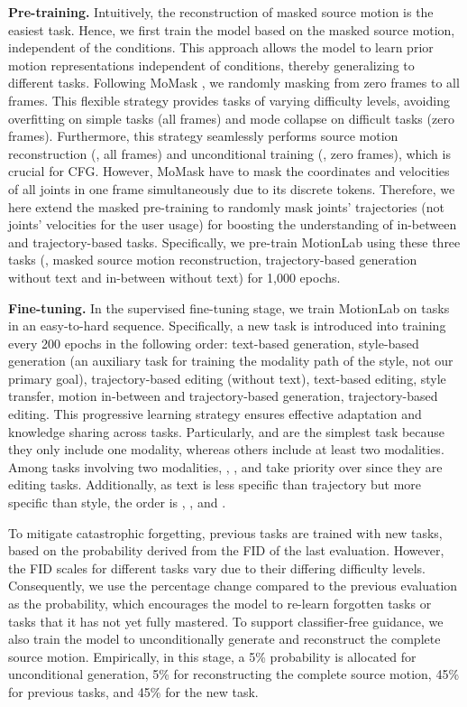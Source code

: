 \noindent\textbf{Pre-training.} Intuitively, the reconstruction of masked source motion is the easiest task. Hence, we first train the model based on the masked source motion, independent of the conditions. This approach allows the model to learn prior motion representations independent of conditions, thereby generalizing to different tasks. Following MoMask \cite{guo2024momask}, we randomly masking from zero frames to all frames. This flexible strategy provides tasks of varying difficulty levels, avoiding overfitting on simple tasks (all frames) and mode collapse on difficult tasks (zero frames). Furthermore, this strategy seamlessly performs source motion reconstruction (\ie, all frames) and unconditional training (\ie, zero frames), which is crucial for CFG. However, MoMask have to mask the coordinates and velocities of all joints in one frame simultaneously due to its discrete tokens. Therefore, we here extend the masked pre-training to randomly mask joints' trajectories (not joints' velocities for the user usage) for boosting the understanding of in-between and trajectory-based tasks. Specifically, we pre-train MotionLab using these three tasks (\ie, masked source motion reconstruction, trajectory-based generation without text and in-between without text) for 1,000 epochs.

\noindent\textbf{Fine-tuning.} 
In the supervised fine-tuning stage, we train MotionLab on tasks in an easy-to-hard sequence. Specifically, a new task is introduced into training every 200 epochs in the following order:  text-based generation,  style-based generation (an auxiliary task for training the modality path of the style, not our primary goal),  trajectory-based editing (without text),  text-based editing,  style transfer,   motion in-between and trajectory-based generation,  trajectory-based editing. 
This progressive learning strategy ensures effective adaptation and knowledge sharing across tasks.
Particularly,  and  are the simplest task because they only include one modality, whereas others include at least two modalities. Among tasks involving two modalities, , , and  take priority over  since they are editing tasks. Additionally, as text is less specific than trajectory but more specific than style,
the order is , , and .

To mitigate catastrophic forgetting, previous tasks are trained with new tasks, based on the probability derived from the FID of the last evaluation. However, the FID scales for different tasks vary due to their differing difficulty levels. Consequently, we use the percentage change compared to the previous evaluation as the probability, which encourages the model to re-learn forgotten tasks or tasks that it has not yet fully mastered. To support classifier-free guidance, we also train the model to unconditionally generate and reconstruct the complete source motion. Empirically, in this stage, a 5\% probability is allocated for unconditional generation, 5\% for reconstructing the complete source motion, 45\% for previous tasks, and 45\% for the new task.

